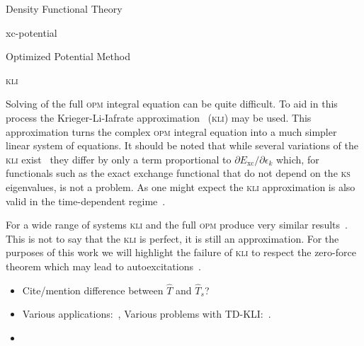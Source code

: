 \documentclass[letterpaper, 10 pt]{report}
\begin{document}
\begin{chapter}{Density Functional Theory \label{chap:dft}}
\begin{section}{xc-potential \label{sec:xcpot}}
\begin{subsection}{Optimized Potential Method \label{sec:opm}}
      \end{subsection}

      \begin{subsection}{\textsc{kli} \label{sec:kli}}

         Solving of the full \textsc{opm} integral equation can be quite difficult. To aid in this
         process the Krieger-Li-Iafrate approximation~\cite{kli1} (\textsc{kli}) may be used. This
         approximation turns the complex \textsc{opm} integral equation into a much simpler linear
         system of equations. It should be noted that while several variations of the \textsc{kli}
         exist~\cite{kli1, kli2, kli3} they differ by only a term proportional to
         $\partial E_\mathrm{xc} / \partial \epsilon_k$ which, for functionals such as the exact
         exchange functional that do not depend on the \textsc{ks} eigenvalues, is not a problem. As one
         might expect the \textsc{kli} approximation is also valid in the time-dependent
         regime~\cite{tdkli1, tdkli2, tdkli3}.
         
         For a wide range of systems \textsc{kli} and the full \textsc{opm} produce very similar
         results~\cite{opm-rev}. This is not to say that the \textsc{kli} is perfect, it is still an
         approximation. For the purposes of this work we will highlight the failure of \textsc{kli} to
         respect the zero-force theorem which may lead to autoexcitations~\cite{kli-zero-force}.

      \end{subsection}

   \end{section}

   \begin{itemize}

      \item Cite/mention difference between $\hat{T}$ and $\hat{T}_s$?

      \item Various applications:~\cite[p. 254]{dft-engel},
         Various problems with TD-KLI:~\cite[p. 135-136]{tddft}.

      \item {\color{red}{?`Should I add more detail?}} %

   \end{itemize}

\end{chapter}
\end{document}
